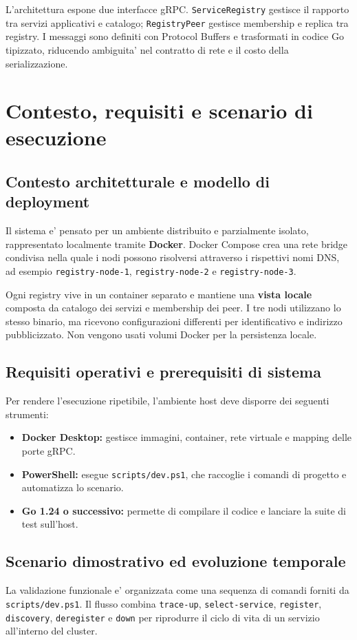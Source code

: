 \documentclass[conference]{IEEEtran}
\begin{document}
L'architettura espone due interfacce gRPC. \texttt{ServiceRegistry} gestisce il rapporto tra servizi applicativi e catalogo; \texttt{RegistryPeer} gestisce membership e replica tra registry. I messaggi sono definiti con Protocol Buffers e trasformati in codice Go tipizzato, riducendo ambiguita' nel contratto di rete e il costo della serializzazione.

\section{Contesto, requisiti e scenario di esecuzione}

\subsection{Contesto architetturale e modello di deployment}
Il sistema e' pensato per un ambiente distribuito e parzialmente isolato, rappresentato localmente tramite \textbf{Docker}. Docker Compose crea una rete bridge condivisa nella quale i nodi possono risolversi attraverso i rispettivi nomi DNS, ad esempio \texttt{registry-node-1}, \texttt{registry-node-2} e \texttt{registry-node-3}.

Ogni registry vive in un container separato e mantiene una \textbf{vista locale} composta da catalogo dei servizi e membership dei peer. I tre nodi utilizzano lo stesso binario, ma ricevono configurazioni differenti per identificativo e indirizzo pubblicizzato. Non vengono usati volumi Docker per la persistenza locale.

\subsection{Requisiti operativi e prerequisiti di sistema}
Per rendere l'esecuzione ripetibile, l'ambiente host deve disporre dei seguenti strumenti:

\begin{itemize}[leftmargin=1.2cm]
  \item \textbf{Docker Desktop:} gestisce immagini, container, rete virtuale e mapping delle porte gRPC.
  \item \textbf{PowerShell:} esegue \texttt{scripts/dev.ps1}, che raccoglie i comandi di progetto e automatizza lo scenario.
  \item \textbf{Go 1.24 o successivo:} permette di compilare il codice e lanciare la suite di test sull'host.
\end{itemize}

\subsection{Scenario dimostrativo ed evoluzione temporale}
La validazione funzionale e' organizzata come una sequenza di comandi forniti da \texttt{scripts/dev.ps1}. Il flusso combina \texttt{trace-up}, \texttt{select-service}, \texttt{register}, \texttt{discovery}, \texttt{deregister} e \texttt{down} per riprodurre il ciclo di vita di un servizio all'interno del cluster.
\end{document}
